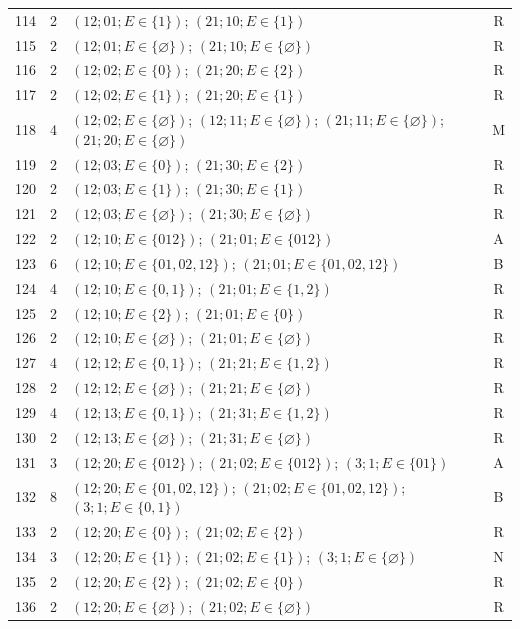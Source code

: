 \begin{longtable}{@{}r r p{10.1cm} c@{}}
114 & 2 & $(12;01;E\in\{1\})$; $(21;10;E\in\{1\})$ & R\\[1mm]
115 & 2 & $(12;01;E\in\{\varnothing\})$; $(21;10;E\in\{\varnothing\})$ & R\\[1mm]
116 & 2 & $(12;02;E\in\{0\})$; $(21;20;E\in\{2\})$ & R\\[1mm]
117 & 2 & $(12;02;E\in\{1\})$; $(21;20;E\in\{1\})$ & R\\[1mm]
118 & 4 & $(12;02;E\in\{\varnothing\})$; $(12;11;E\in\{\varnothing\})$; $(21;11;E\in\{\varnothing\})$; $(21;20;E\in\{\varnothing\})$ & M\\[1mm]
119 & 2 & $(12;03;E\in\{0\})$; $(21;30;E\in\{2\})$ & R\\[1mm]
120 & 2 & $(12;03;E\in\{1\})$; $(21;30;E\in\{1\})$ & R\\[1mm]
121 & 2 & $(12;03;E\in\{\varnothing\})$; $(21;30;E\in\{\varnothing\})$ & R\\[1mm]
122 & 2 & $(12;10;E\in\{012\})$; $(21;01;E\in\{012\})$ & A\\[1mm]
123 & 6 & $(12;10;E\in\{01,02,12\})$; $(21;01;E\in\{01,02,12\})$ & B\\[1mm]
124 & 4 & $(12;10;E\in\{0,1\})$; $(21;01;E\in\{1,2\})$ & R\\[1mm]
125 & 2 & $(12;10;E\in\{2\})$; $(21;01;E\in\{0\})$ & R\\[1mm]
126 & 2 & $(12;10;E\in\{\varnothing\})$; $(21;01;E\in\{\varnothing\})$ & R\\[1mm]
127 & 4 & $(12;12;E\in\{0,1\})$; $(21;21;E\in\{1,2\})$ & R\\[1mm]
128 & 2 & $(12;12;E\in\{\varnothing\})$; $(21;21;E\in\{\varnothing\})$ & R\\[1mm]
129 & 4 & $(12;13;E\in\{0,1\})$; $(21;31;E\in\{1,2\})$ & R\\[1mm]
130 & 2 & $(12;13;E\in\{\varnothing\})$; $(21;31;E\in\{\varnothing\})$ & R\\[1mm]
131 & 3 & $(12;20;E\in\{012\})$; $(21;02;E\in\{012\})$; $(3;1;E\in\{01\})$ & A\\[1mm]
132 & 8 & $(12;20;E\in\{01,02,12\})$; $(21;02;E\in\{01,02,12\})$; $(3;1;E\in\{0,1\})$ & B\\[1mm]
133 & 2 & $(12;20;E\in\{0\})$; $(21;02;E\in\{2\})$ & R\\[1mm]
134 & 3 & $(12;20;E\in\{1\})$; $(21;02;E\in\{1\})$; $(3;1;E\in\{\varnothing\})$ & N\\[1mm]
135 & 2 & $(12;20;E\in\{2\})$; $(21;02;E\in\{0\})$ & R\\[1mm]
136 & 2 & $(12;20;E\in\{\varnothing\})$; $(21;02;E\in\{\varnothing\})$ & R\\[1mm]

\end{longtable}
